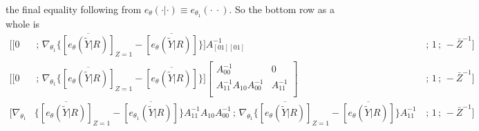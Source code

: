 \documentclass[12pt]{article}
\begin{document}
the final equality following from  $e_{\theta}(\cdot | \cdot) \equiv
e_{\theta_{1}} (\cdot \ \cdot)$. So the bottom row as a whole is 
\begin{align*}
 \bigg[ \big[ 0& \, ; \,  \nabla_{\theta_1}  \{
  \overline{[e_{\theta}(\tilde{Y} | R)]}_{Z=1}  -
  \overline{[e_{\theta}(\tilde{Y} | R)]} \} \big] A_{[01][01]}^{-1} &\, ;
  \, 1 \, ; \, -\bar{Z}^{-1} \bigg] \\
  \bigg[ \big[ 0& \, ; \,  \nabla_{\theta_1}  \{
  \overline{[e_{\theta}(\tilde{Y} | R)]}_{Z=1}  -
  \overline{[e_{\theta}(\tilde{Y} | R)]} \} \big] \left[
               \begin{array}{cc}
                 A_{00}^{-1}& 0 \\
                  A_{11}^{-1} A_{10}A_{00}^{-1} & A_{11}^{-1} \\
               \end{array}
\right]  &\, ;
  \, 1 \, ; \, -\bar{Z}^{-1} \bigg] \\
\bigg[
   \nabla_{\theta_{1}} &\{
      \overline{[e_{\theta}(\tilde{Y} | R)]}_{Z=1} -  \overline{[e_{\theta_{1}}(\tilde{Y} | R)]}\}  A_{11}^{-1}
    A_{10} A_{00}^{-1} \, ; \, 
\nabla_{\theta_{1}} \{
      \overline{[e_{\theta}(\tilde{Y} | R)]}_{Z=1}  -
                         \overline{[e_{\theta}(\tilde{Y} | R)]}\}
                         A_{11}^{-1}  &\, ; \, 
1 \, ; \,   - \bar{Z}^{-1} \bigg] 
\end{align*}
\end{document}
